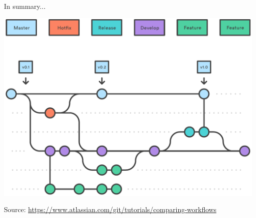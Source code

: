 \documentclass[svgnames]{beamer}
\begin{document}
\begin{frame}{In summary...}

    \begin{center}
        \includegraphics[scale=0.5]{img/05-_2_.pdf}    
    \end{center}
    
    \tiny Source: \url{https://www.atlassian.com/git/tutorials/comparing-workflows}

\end{frame}    
\end{document}

